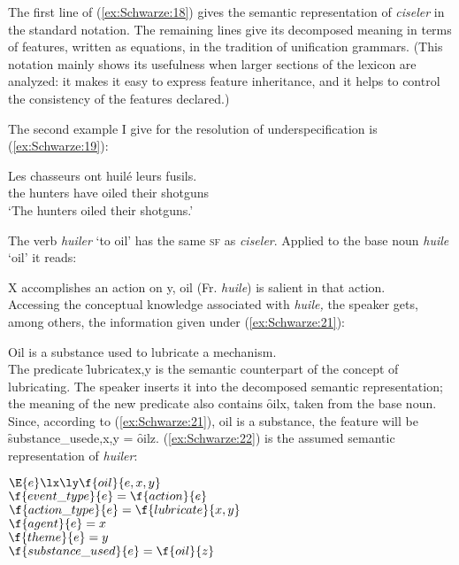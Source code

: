 \documentclass[output=paper]{langsci/langscibook}
\begin{document}
The first line of (\ref{ex:Schwarze:18}) gives the semantic representation of
\emph{ciseler} in the standard notation. The remaining lines give its decomposed meaning in terms of features, written as equations, in the tradition of unification grammars. (This notation mainly shows its usefulness when larger sections of the lexicon are analyzed: it makes it easy to express feature inheritance, and it helps to control the consistency of the features declared.)

The second example I give for the resolution of underspecification is
(\ref{ex:Schwarze:19}):

\ea\label{ex:Schwarze:19} \gll Les chasseurs ont huilé leurs fusils.\\
          the hunters have oiled their shotguns\\
        \glt `The hunters oiled their shotguns.'\\
\z

The verb \emph{huiler} `to oil' has the same \textsc{sf} as \emph{ciseler}.
Applied to the base noun \emph{huile} `oil' it reads:

\ea\label{ex:Schwarze:20} X accomplishes an action on y, oil (Fr. \emph{huile}) is salient in that action.\\
\z
Accessing the conceptual knowledge associated with \emph{huile,} the speaker gets, among others, the information given under (\ref{ex:Schwarze:21}):

\ea\label{ex:Schwarze:21} Oil is a substance used to lubricate a mechanism.\\
\z
The predicate \f{lubricate}{x,y} is the semantic counterpart of the concept of lubricating. The speaker inserts it into the decomposed semantic representation; the meaning of the new predicate also contains \f{oil}{x},
taken from the base noun. Since, according to (\ref{ex:Schwarze:21}), oil is a substance,
the feature will  be \f{substance\_used}{e,x,y} = \f{oil}{z}. (\ref{ex:Schwarze:22}) is the assumed semantic representation of \emph{huiler}:

\ea\label{ex:Schwarze:22}
$\E{e} \lx \ly \f{oil}{e,x,y}$\\
$\f{event\_type}{e}=\f{action}{e}$\\
$\f{action\_type}{e}=\f{lubricate}{x,y}$\\
$\f{agent}{e}=x$\\
$\f{theme}{e}=y$\\
$\f{substance\_used}{e}=\f{oil}{z}$\\
\z
\end{document}
